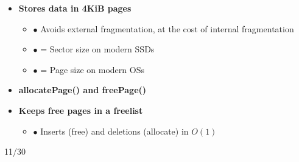 \documentclass{article}
\begin{document}
\vspace{30pt}

\begin{itemize}
    \setlength{\itemsep}{10pt}
    \item[] \textbf{Stores data in 4KiB pages}
    \begin{itemize}
        \item[] $\bullet$ Avoids external fragmentation, at the cost of internal fragmentation
        \item[] $\bullet$ = Sector size on modern SSDs
        \item[] $\bullet$ = Page size on modern OSs
    \end{itemize}
    
    \vspace{10pt}
    \item[] \textbf{allocatePage() and freePage()}
    
    \vspace{10pt}
    \item[] \textbf{Keeps free pages in a freelist}
    \begin{itemize}
        \item[] $\bullet$ Inserts (free) and deletions (allocate) in $O(1)$
    \end{itemize}
\end{itemize}

\vfill

\hfill \footnotesize 11/30
\end{document}
